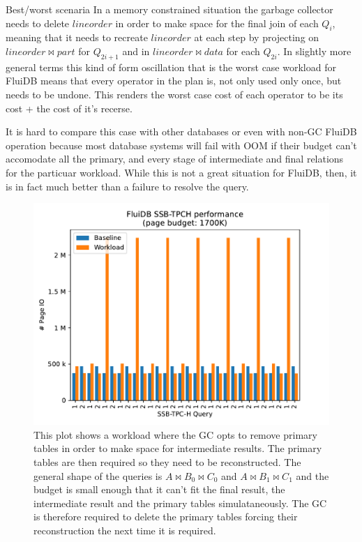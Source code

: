 \begin{corrected}{Best/worst scenaria}
  In a memory constrained situation the garbage collector needs to
  delete \(lineorder\) in order to make space for the final join of each
  \(Q_i\), meaning that it needs to recreate \(lineorder\) at each step
  by projecting on \(lineorder \Join part\) for \(Q_{2i + 1}\) and in
  \(lineorder \Join data\) for each \(Q_{2i}\). In slightly more general
  terms this kind of form oscillation that is the worst case workload
  for FluiDB means that every operator in the plan is, not only used
  only once, but needs to be undone. This renders the worst case cost of
  each operator to be its cost + the cost of it's recerse.

  It is hard to compare this case with other databases or even with
  non-GC FluiDB operation because most database systems will fail with
  OOM if their budget can't accomodate all the primary, and every stage
  of intermediate and final relations for the particuar workload. While
  this is not a great situation for FluiDB, then, it is in fact much
  better than a failure to resolve the query.

  \begin{figure}[H]
    \centering
    \includegraphics[width=.9\linewidth]{./plans/workload_1700K.pdf}
    \caption{\label{fig:gc_enemy}This plot shows a workload where the GC
      opts to remove primary tables in order to make space for
      intermediate results. The primary tables are then required so they
      need to be reconstructed. The general shape of the queries is
      \(A \Join B_0 \Join C_0\) and \(A \Join B_1 \Join C_1\) and the
      budget is small enough that it can't fit the final result, the
      intermediate result and the primary tables simulataneously. The GC
      is therefore required to delete the primary tables forcing their
      reconstruction the next time it is required.}
  \end{figure}
\end{corrected}


